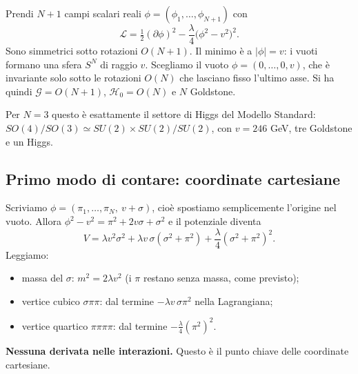 \documentclass[11pt,a4paper]{article}
\numberwithin{equation}{section}
\theoremstyle{remark}
\newcommand{\G}{\mathcal{G}}
\newcommand{\Hg}{\mathcal{H}_0}
\begin{document}
Prendi $N+1$ campi scalari reali $\phi=(\phi_1,\dots,\phi_{N+1})$ con
\begin{equation}
\mathcal L=\tfrac12(\partial\phi)^2-\frac{\lambda}{4}\big(\phi^2-v^2\big)^2 .
\end{equation}
Sono simmetrici sotto rotazioni $O(N+1)$. Il minimo è a $|\phi|=v$: i vuoti formano una sfera $S^N$ di raggio $v$. Scegliamo il vuoto $\phi=(0,\dots,0,v)$, che è invariante solo sotto le rotazioni $O(N)$ che lasciano fisso l'ultimo asse. Si ha quindi $\G=O(N+1)$, $\Hg=O(N)$ e $N$ Goldstone.

Per $N=3$ questo è esattamente il settore di Higgs del Modello Standard: $SO(4)/SO(3)\simeq SU(2)\times SU(2)/SU(2)$, con $v=246$ GeV, tre Goldstone e un Higgs.

\subsection{Primo modo di contare: coordinate cartesiane}

Scriviamo $\phi=(\pi_1,\dots,\pi_N,\ v+\sigma)$, cioè spostiamo semplicemente l'origine nel vuoto. Allora $\phi^2-v^2=\pi^2+2v\sigma+\sigma^2$ e il potenziale diventa
\[
V=\lambda v^2\sigma^2+\lambda v\,\sigma(\sigma^2+\pi^2)+\frac\lambda4(\sigma^2+\pi^2)^2 .
\]
Leggiamo:
\begin{itemize}[nosep]
\item massa del $\sigma$: $m^2=2\lambda v^2$ (i $\pi$ restano senza massa, come previsto);
\item vertice cubico $\sigma\pi\pi$: dal termine $-\lambda v\,\sigma\pi^2$ nella Lagrangiana;
\item vertice quartico $\pi\pi\pi\pi$: dal termine $-\frac\lambda4(\pi^2)^2$.
\end{itemize}
\textbf{Nessuna derivata nelle interazioni.} Questo è il punto chiave delle coordinate cartesiane.
\end{document}
